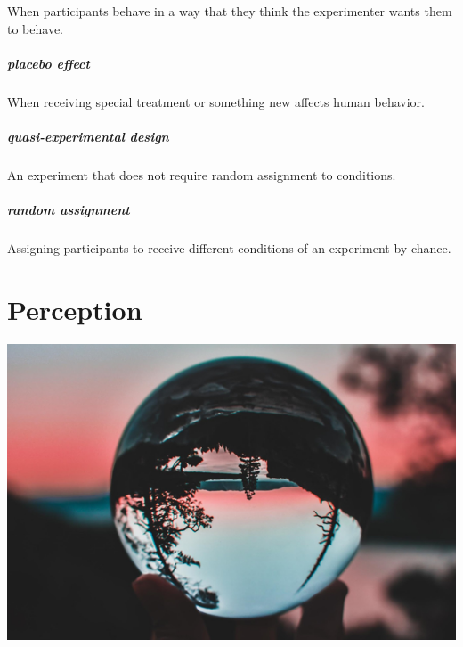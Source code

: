 \documentclass[
]{krantz}
\begin{document}
When participants behave in a way that they think the experimenter wants them to behave.

\paragraph*{placebo effect}\label{placebo-effect}

When receiving special treatment or something new affects human behavior.

\paragraph*{quasi-experimental design}\label{quasi-experimental-design}

An experiment that does not require random assignment to conditions.

\paragraph*{random assignment}\label{random-assignment}

Assigning participants to receive different conditions of an experiment by chance.

\chapter{Perception}\label{perception}

\begin{center}\includegraphics[width=1\linewidth]{images/ch2/intro} \end{center}
\end{document}
